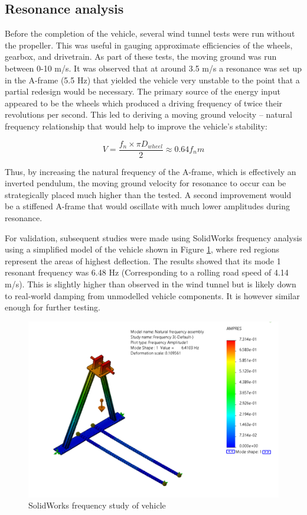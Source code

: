 \subsection{Resonance analysis}

Before the completion of the vehicle, several wind tunnel tests were run without the propeller. This was useful in gauging approximate efficiencies of the wheels, gearbox, and drivetrain. As part of these tests, the moving ground was run between 0-10 m/s. It was observed that at around 3.5 m/s a resonance was set up in the A-frame (5.5 Hz) that yielded the vehicle very unstable to the point that a partial redesign would be necessary. The primary source of the energy input appeared to be the wheels which produced a driving frequency of twice their revolutions per second. This led to deriving a moving ground velocity – natural frequency relationship that would help to improve the vehicle’s stability:

\begin{equation}
V=\frac{f_{n} \times \pi D_{w h e e l}}{2} \approx 0.64 f_{n} m
\label{eq:natfreq}
\end{equation}

Thus, by increasing the natural frequency of the A-frame, which is effectively an inverted pendulum, the moving ground velocity for resonance to occur can be strategically placed much higher than the tested. A second improvement would be a stiffened A-frame that would oscillate with much lower amplitudes during resonance.

For validation, subsequent studies were made using SolidWorks frequency analysis using a simplified model of the vehicle shown in Figure \ref{fig:freqStudy}, where red regions represent the areas of highest deflection. The results showed that its mode 1 resonant frequency was 6.48 Hz (Corresponding to a rolling road speed of 4.14 m/s). This is slightly higher than observed in the wind tunnel but is likely down to real-world damping from unmodelled vehicle components. It is however similar enough for further testing.

\begin{figure}[!htbp]
    \centering
    \includegraphics{images/part8/freqStudy.png}
    \caption{SolidWorks frequency study of vehicle}
    \label{fig:freqStudy}
\end{figure}

